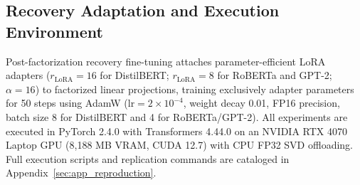 \subsection{Recovery Adaptation and Execution Environment}

Post-factorization recovery fine-tuning attaches parameter-efficient LoRA adapters ($r_\text{LoRA} = 16$ for DistilBERT; $r_\text{LoRA} = 8$ for RoBERTa and GPT-2; $\alpha = 16$) to factorized linear projections, training exclusively adapter parameters for 50 steps using AdamW ($\mathrm{lr} = 2\times 10^{-4}$, weight decay 0.01, FP16 precision, batch size 8 for DistilBERT and 4 for RoBERTa/GPT-2). All experiments are executed in PyTorch 2.4.0 with Transformers 4.44.0 on an NVIDIA RTX 4070 Laptop GPU (8,188 MB VRAM, CUDA 12.7) with CPU FP32 SVD offloading. Full execution scripts and replication commands are cataloged in Appendix~\ref{sec:app_reproduction}.